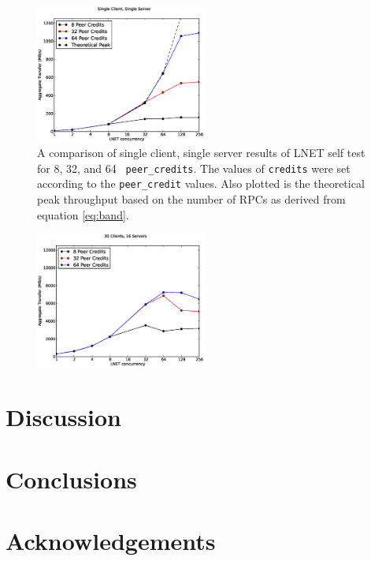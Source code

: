 \documentclass[]{sigplan-proc}
\begin{document}
\begin{figure}
\centering
\includegraphics[width=0.50\textwidth]{figures/ss_plot.eps}
\caption{A comparison of single client, single server results of LNET self test for 8, 32, and 64 {\tt
    peer\_credits}. The values of {\tt credits} were set according to the {\tt peer\_credit} values. Also
  plotted is the theoretical peak throughput based on the number of RPCs as derived from equation \ref{eq:band}.}
\label{fig:singleserver}
\end{figure}

\begin{figure}
\centering
\includegraphics[width=0.50\textwidth]{figures/all_pc_plot.eps}
\caption{}
\label{fig:allserver}
\end{figure}

\section{Discussion}\label{sec:discussion} 

\section{Conclusions}\label{sec:conclusion}
  
\section{Acknowledgements}
\end{document}
